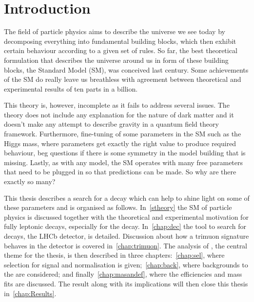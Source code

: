 \chapter{Introduction}



The field of particle physics aims to describe the universe we see today by decomposing everything into fundamental building blocks, which then exhibit certain behaviour according to a given set of rules. So far, the best theoretical formulation that describes the universe around us in form of these building blocks, the Standard Model (\Gls{SM}), was conceived last century. Some achievements of the \gls{SM} do really leave us breathless with agreement between theoretical and experimental results of ten parts in a billion. 

This theory is, however, incomplete as it fails to address several issues. The theory does not include any explanation for the nature of dark matter and it doesn't make any attempt to describe gravity in a quantum field theory framework. Furthermore, fine-tuning of some parameters in the \gls{SM} such as the Higgs mass, where parameters get exactly the right value to produce required behaviour, beg questions if there is some symmetry in the model building that is missing. Lastly, as with any model, the \gls{SM} operates with many free parameters that need to be plugged in so that predictions can be made. So why are there exactly so many?

This thesis describes a search for a decay which can help to shine light on some of these parameters and is organised as follows. In~\autoref{stheory} the \gls{SM} of particle physics is discussed together with the theoretical and experimental motivation for fully leptonic decays, especially for the \Bmumumu decay. In~\autoref{chap:dec} the tool to search for \Bmumumu decays, the LHCb detector, is detailed. Discussion about how a trimuon signature behaves in the detector is covered in~\autoref{chap:trimuon}. The analysis of \Bmumumu, the central theme for the thesis, is then described in three chapters:~\autoref{chap:sel}, where selection for signal and normalisation is given;~\autoref{chap:back}, where backgrounds to the \Bmumumu are considered; and finally~\autoref{chap:masandef}, where the efficiencies and mass fits are discussed. The result along with its implications will then close this thesis in~\autoref{chap:Results}.

